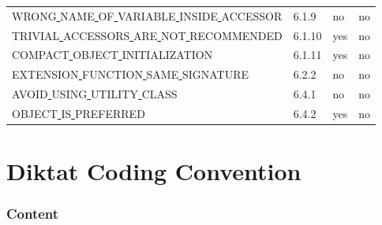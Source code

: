 \begin{longtable}{ |l|p{0.8cm}|p{0.8cm}| p{3cm} | }
WRONG\underline{ }NAME\underline{ }OF\underline{ }VARIABLE\underline{ }INSIDE\underline{ }ACCESSOR & 6.1.9 &  no  &   no \\
TRIVIAL\underline{ }ACCESSORS\underline{ }ARE\underline{ }NOT\underline{ }RECOMMENDED & 6.1.10 &  yes  &   no  \\
COMPACT\underline{ }OBJECT\underline{ }INITIALIZATION & 6.1.11 &  yes  &   no  \\
EXTENSION\underline{ }FUNCTION\underline{ }SAME\underline{ }SIGNATURE & 6.2.2 &  no  &   no  \\
AVOID\underline{ }USING\underline{ }UTILITY\underline{ }CLASS & 6.4.1 &  no  &  no \\
OBJECT\underline{ }IS\underline{ }PREFERRED & 6.4.2 &  yes  &  no \\
\hline
\end{longtable}
\section*{\textbf{Diktat Coding Convention}}
\subsubsection*{\textbf{Content}}
\leavevmode\newline

